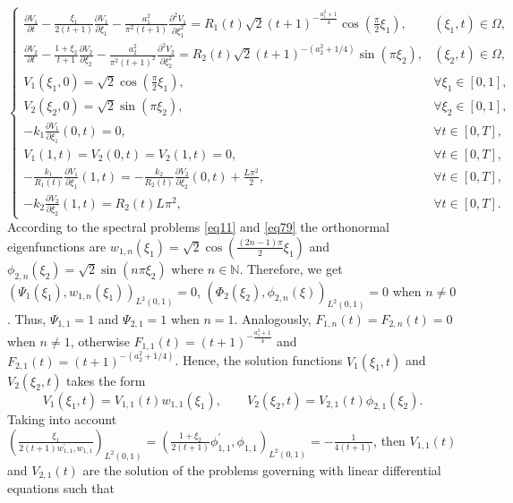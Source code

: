 \documentclass[preprint,12pt,authoryear]{elsarticle}
\begin{document}
\begin{equation}\label{eq90-a}
    \begin{cases}
        \frac{\partial V_1}{\partial t}-\frac{\xi_1}{2(t+1)}\frac{\partial V_1}{\partial \xi_1}-\frac{a_1^2}{\pi^2(t+1)}\frac{\partial^2V_1}{\partial\xi_1^2}=R_1(t)\sqrt{2}(t+1)^{-\frac{a_1^2+1}{4}}\cos\left(\frac{\pi}{2}\xi_1\right),&(\xi_1,t)\in\Omega,\\
        \frac{\partial V_2}{\partial t}-\frac{1+\xi_2}{t+1}\frac{\partial V_2}{\partial \xi_2}-\frac{a_2^2}{\pi^2(t+1)^2}\frac{\partial^2V_2}{\partial\xi_2^2}=R_2(t)\sqrt{2}(t+1)^{-(a_2^2+1/4)}\sin\left(\pi\xi_2\right),&(\xi_2,t)\in\Omega,\\
        V_1(\xi_1,0)=\sqrt{2}\cos\left(\frac{\pi}{2}\xi_1\right),&\forall\xi_1\in[0,1],\\
        V_2(\xi_2,0)=\sqrt{2}\sin\left(\pi\xi_2\right),&\forall\xi_2\in[0,1],\\
        -k_1\frac{\partial V_1}{\partial\xi_1}(0,t)=0,&\forall t\in[0,T],\\
        V_1(1,t)=V_2(0,t)=V_2(1,t)=0,&\forall t\in[0,T],\\
        -\frac{k_1}{R_1(t)}\frac{\partial V_1}{\partial\xi_1}(1,t)=-\frac{k_2}{R_2(t)}\frac{\partial V_2}{\partial\xi_2}(0,t)+\frac{L\pi^2}{2},&\forall t\in[0,T],\\
        -k_2\frac{\partial V_2}{\partial\xi_2}(1,t)=R_2(t)L\pi^2,&\forall t\in[0,T].
    \end{cases}
\end{equation}
According to the spectral problems \eqref{eq11} and  \eqref{eq79} the orthonormal eigenfunctions are $w_{1,n}(\xi_1)=\sqrt{2}\cos\left(\frac{(2n-1)\pi}{2}\xi_1\right)$ and $\phi_{2,n}(\xi_2)=\sqrt{2}\sin\left(n\pi\xi_2\right)$ where $n\in\mathbb{N}$. Therefore, we get $(\Psi_{1}(\xi_1),w_{1,n}(\xi_1))_{L^2(0,1)}=0$, $(\Phi_{2}(\xi_2),\phi_{2,n}(\xi))_{L^2(0,1)}=0$ when $n\neq 0$. Thus, $\Psi_{1,1}=1$ and $\Psi_{2,1}=1$ when $n=1$. Analogously, $F_{1,n}(t)=F_{2,n}(t)=0$ when $n\neq 1$, otherwise $F_{1,1}(t)=(t+1)^{-\frac{a_1^2+1}{4}}$ and $F_{2,1}(t)=(t+1)^{-(a_2^2+1/4)}$. Hence, the solution functions $V_1(\xi_1,t)$ and $V_2(\xi_2,t)$ takes the form
\begin{equation}\label{eq91}
    V_{1}(\xi_1,t)=V_{1,1}(t)w_{1,1}(\xi_1),\quad\quad V_2(\xi_2,t)=V_{2,1}(t)\phi_{2,1}(\xi_2).
\end{equation}
Taking into account $\left(\frac{\xi_1}{2(t+1)w_{1,1}^{\prime},w_{1,1}}\right)_{L^2(0,1)}=\left(\frac{1+\xi_2}{2(t+1)}\phi_{1,1}^{\prime},\phi_{1,1}\right)_{L^2(0,1)}=-\frac{1}{4(t+1)}$, then $V_{1,1}(t)$ and $V_{2,1}(t)$ are the solution of the problems governing with linear differential equations such that
\end{document}
